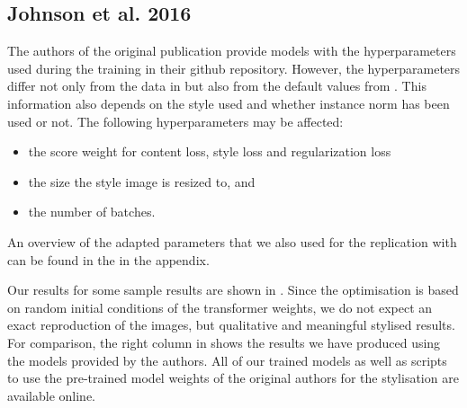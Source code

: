 \subsection{Johnson et al. 2016}
The authors of the original publication provide models with the hyperparameters used during the training in their github repository. However, the hyperparameters differ not only from the data in \paper{} but also from the default values from \implementation{}. This information also depends on the style used and whether instance norm has been used or not. The following hyperparameters may be affected:

\begin{itemize}
	\item the score weight for content loss, style loss and regularization loss
	\item the size the style image is resized to, and
	\item the number of batches.
\end{itemize}

An overview of the adapted parameters that we also used for the replication with \implementation{} can be found in the  in the appendix.

Our results for some sample results are shown in . Since the optimisation is based on random initial conditions of the transformer weights, we do not expect an exact reproduction of the images, but qualitative and meaningful stylised results. For comparison, the right column in  shows the results we have produced using the models provided by the authors. All of our trained models as well as scripts to use the pre-trained model weights of the original authors for the stylisation are available online.

